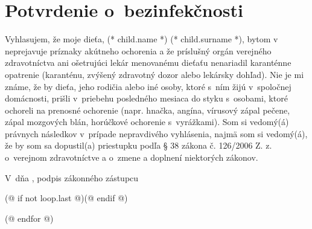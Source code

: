\documentclass[12pt, twoside]{article}
\begin{document}
    \cutHere

    \section{Potvrdenie o~bezinfekčnosti}
        Vyhlasujem, že moje dieťa, (* child.name *) (* child.surname *), bytom v~\makebox[30mm]{\dotfill} neprejavuje príznaky akútneho ochorenia a že
        príslušný orgán verejného zdravotníctva ani ošetrujúci lekár menovanému dieťaťu nenariadil
        karanténne opatrenie (karanténu, zvýšený zdravotný dozor alebo lekársky dohľad). Nie je mi známe, že
        by dieťa, jeho rodičia alebo iné osoby, ktoré s~ním žijú v~spoločnej domácnosti, prišli v~priebehu
        posledného mesiaca do styku s~osobami, ktoré ochoreli na prenosné ochorenie (napr. hnačka, angína,
        vírusový zápal pečene, zápal mozgových blán, horúčkové ochorenie s~vyrážkami). Som si
        vedomý(á) právnych následkov v~prípade nepravdivého vyhlásenia, najmä som si vedomý(á), že by som sa
        dopustil(a) priestupku podľa § 38 zákona č. 126/2006 Z. z. o~verejnom zdravotníctve a o~zmene a
        doplnení niektorých zákonov.
        \vspace{5mm}

        V~\dotfill dňa \dotfill, \hfill podpis zákonného zástupcu \dotfill
        \vspace*{5mm}

    \cutHere
    (@ if not loop.last @)\newpage(@ endif @)

    (@ endfor @)
\end{document}
